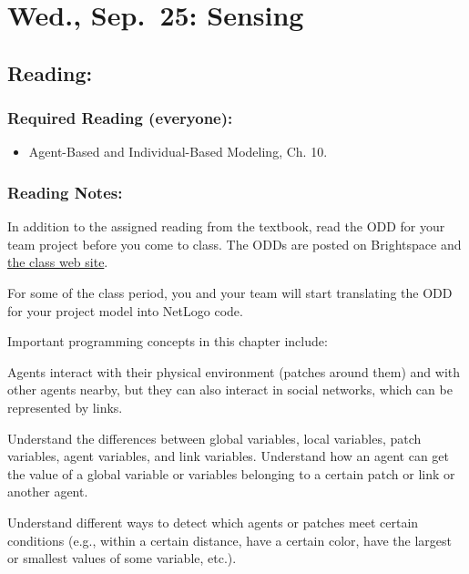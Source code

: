 \documentclass[
]{article}
\providecommand{\tightlist}{%
  \setlength{\itemsep}{0pt}\setlength{\parskip}{0pt}}
\begin{document}
\section{Wed., Sep.~25: Sensing}\label{wed.-sep.-25-sensing}

\subsection{Reading:}\label{reading-10}

\subsubsection{Required Reading
(everyone):}\label{required-reading-everyone-9}

\begin{itemize}
\tightlist
\item
  Agent-Based and Individual-Based Modeling, Ch. 10.
\end{itemize}

\subsubsection{Reading Notes:}\label{reading-notes-9}

In addition to the assigned reading from the textbook, read the ODD for
your team project before you come to class. The ODDs are posted on
Brightspace and \href{https://ees4760.jgilligan.org/projects/}{the class
web site}.

For some of the class period, you and your team will start translating
the ODD for your project model into NetLogo code.

Important programming concepts in this chapter include:

\begin{description}
\tightlist
\item[Links:]
Agents interact with their physical environment (patches around them)
and with other agents nearby, but they can also interact in social
networks, which can be represented by links.
\item[Variable scope:]
Understand the differences between global variables, local variables,
patch variables, agent variables, and link variables. Understand how an
agent can get the value of a global variable or variables belonging to a
certain patch or link or another agent.
\item[Entity detection:]
Understand different ways to detect which agents or patches meet certain
conditions (e.g., within a certain distance, have a certain color, have
the largest or smallest values of some variable, etc.).
\end{description}
\end{document}
